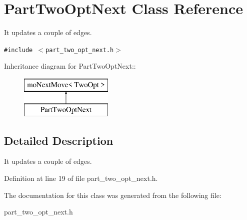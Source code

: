 \section{PartTwoOptNext Class Reference}
\label{class_part_two_opt_next}
It updates a couple of edges.  


{\tt \#include $<$part\_\-two\_\-opt\_\-next.h$>$}

Inheritance diagram for PartTwoOptNext::\begin{figure}[H]
\begin{center}
\leavevmode
\includegraphics[height=2cm]{class_part_two_opt_next}
\end{center}
\end{figure}


\subsection{Detailed Description}
It updates a couple of edges. 



Definition at line 19 of file part\_\-two\_\-opt\_\-next.h.

The documentation for this class was generated from the following file:\begin{CompactItemize}
\item 
part\_\-two\_\-opt\_\-next.h\end{CompactItemize}
